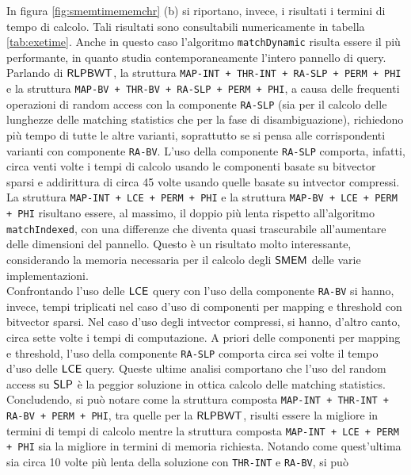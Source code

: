 In figura \ref{fig:smemtimememchr} (b) si riportano, invece, i risultati i
termini di tempo di calcolo. Tali risultati sono
consultabili numericamente in tabella \ref{tab:exetime}. Anche in questo caso
l'algoritmo 
\texttt{matchDynamic} risulta essere il più performante, in quanto studia
contemporaneamente l'intero pannello di query. Parlando di $\mbox{\rm {\sf RLPBWT}}$,  la
struttura \texttt{MAP-INT + THR-INT + RA-SLP + PERM + PHI} e la 
struttura 
\texttt{MAP-BV + THR-BV + RA-SLP + PERM + PHI}, a causa delle
frequenti operazioni di random access con la componente
\texttt{RA-SLP} (sia per il calcolo delle lunghezze delle 
matching statistics che per la fase di disambiguazione), richiedono più tempo
di tutte le altre varianti, soprattutto se si pensa alle corrispondenti
varianti con componente \texttt{RA-BV}. L'uso della componente \texttt{RA-SLP}
comporta, infatti, circa venti volte i tempi di calcolo usando le componenti
basate su
bitvector sparsi e addirittura di circa 45 volte usando quelle basate su
intvector compressi. La struttura \texttt{MAP-INT + LCE +
  PERM + PHI} e la struttura 
\texttt{MAP-BV + LCE + PERM + PHI} risultano essere, al massimo,
il doppio più lenta rispetto all'algoritmo \texttt{matchIndexed}, con una
differenze che diventa quasi trascurabile all'aumentare delle dimensioni del
pannello. Questo è un 
risultato molto interessante, considerando la memoria necessaria
per il calcolo degli $\mbox{\rm {\sf SMEM}}$ delle varie implementazioni.\\
Confrontando l'uso delle $\mbox{\rm {\sf LCE}}$ query con l'uso della componente
\texttt{RA-BV} si hanno, invece, tempi triplicati nel caso d'uso di componenti
per mapping e 
threshold con bitvector sparsi. Nel caso d'uso degli intvector compressi, si
hanno, d'altro canto, circa sette volte i tempi di 
computazione. A priori delle componenti per mapping e
threshold, l'uso della componente \texttt{RA-SLP} comporta circa sei
volte il tempo d'uso delle $\mbox{\rm {\sf LCE}}$ query. Queste ultime analisi comportano
che l'uso del random access su $\mbox{\rm {\sf SLP}}$ è la peggior soluzione in
ottica calcolo delle matching statistics.\\
Concludendo, si può notare come la struttura composta
\texttt{MAP-INT + THR-INT + RA-BV + PERM + PHI}, tra quelle per la
$\mbox{\rm {\sf RLPBWT}}$, risulti essere la migliore in termini di tempi di calcolo
mentre la struttura composta \texttt{MAP-INT + LCE + PERM + PHI} sia la
migliore in termini di memoria richiesta. Notando come quest'ultima sia circa 10
volte più lenta della soluzione con \texttt{THR-INT} e \texttt{RA-BV}, si può
